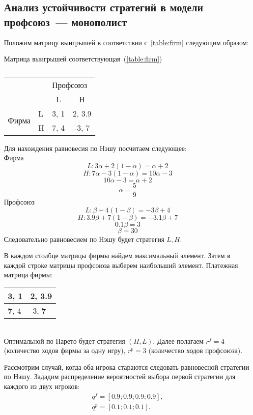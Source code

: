 \subsection{Анализ устойчивости стратегий в модели профсоюз~--- монополист}
Положим матрицу выигрышей в соответствии с~\ref{table:firm} следующим образом:
\newpage
\begin{table}[h]
	
	\centering
	\caption{}
	Матрица выигрышей соответствующая~(\ref{table:firm})\\
	\normalsize
\begin{tabular}{|l|l|c|c|}
	\hline
	\multicolumn{2}{|l|}{\multirow{2}{*}{}} & \multicolumn{2}{l|}{Профсоюз} \\ \cline{3-4} 
	\multicolumn{2}{|l|}{}                  & L            & H              \\ \hline
	\multirow{2}{*}{Фирма}        & L       & 3, 1         & 2, 3.9         \\ \cline{2-4} 
	& H       & 7, 4         & -3, 7          \\ \hline
\end{tabular}
	\label{table:mono:ex}
\end{table}
Для нахождения равновесия по Нэшу посчитаем следующее: \\
Фирма
	$$ L:  3\alpha + 2(1-\alpha)=\alpha + 2$$
	$$ H: 7\alpha - 3(1-\alpha)=10\alpha - 3$$
	$$10\alpha - 3 = \alpha+2 $$
	$$\alpha = \frac{5}{9} $$
Профсоюз	
	 $$L: \beta + 4(1-\beta)=-3\beta + 4$$
	 $$H: 3.9\beta + 7(1-\beta)=-3.1\beta +7$$
	$$0.1\beta  = 3 $$
	$$\beta = 30 $$
Следовательно равновесием по Нэшу будет стратегия $L,H$.

В каждом столбце матрицы фирмы найдем максимальный элемент. 
Затем в каждой строке матрицы профсоюза выберем наибольший элемент.
Платежная матрица фирмы:
\begin{table}[h]
	\centering
	\begin{tabular}{|l|l|}
		\hline
		3, 1 & \textbf{2, 3.9}  \\ \hline
		\textbf{7}, 4 & -3, \textbf{7} \\ \hline
	\end{tabular}
\end{table}\\
Оптимальной по Парето будет стратегия $(H,L)$. Далее полагаем $r^f= 4 $ (количество ходов фирмы за одну игру),
$r^p= 3$ (количество ходов профсоюза). 

 Рассмотрим случай, когда оба игрока стараются следовать равновесной стратегии
 по Нэшу.  Зададим распределение вероятностей выбора первой стратегии для
 каждого из двух игроков:
 \begin{gather*}
 	q^f = \left[ 0.9; 0.9; 0.9; 0.9 \right], \\
 	q^p = \left[ 0.1; 0.1; 0.1 \right].
 \end{gather*}

